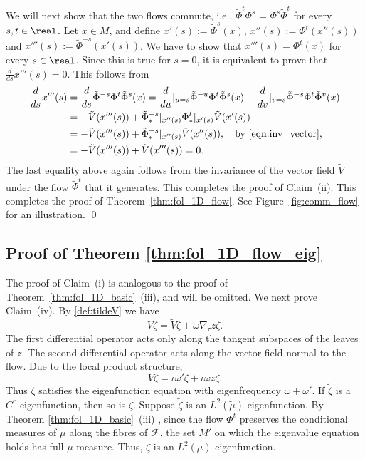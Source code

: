 \documentclass[12pt,oneside]{article}
\newcommand{\Fol}{\mathcal{F}}
\begin{document}
We will next show that the two flows commute, i.e., $\tilde{\Phi}^t \Phi^s $ = $\Phi^s \tilde{\Phi}^{t}$ for every $s,t\in\real$. Let $x\in M$, and define $x'(s) := \tilde{\Phi}^s(x)$, $x''(s) := \Phi^t(x''(s))$ and $x'''(s) := \tilde{\Phi}^{-s}(x'(s))$. We have to show that $x'''(s) = \Phi^t(x)$ for every $s\in\real$. Since this is true for $s=0$, it is equivalent to prove that $\frac{d}{ds} x'''(s) = 0$. This follows from
%
\[\begin{split}
\frac{d}{ds} x'''(s) &= \frac{d}{ds} \tilde{\Phi}^{-s} \Phi^t \tilde{\Phi}^s(x) = \frac{d}{du}|_{u=s} \tilde{\Phi}^{-u} \Phi^t \tilde{\Phi}^s(x) + \frac{d}{dv}|_{v=s} \tilde{\Phi}^{-s} \Phi^t \tilde{\Phi}^v(x) \\
&= -\tilde{V}(x'''(s)) + \tilde{\Phi}^{-s}_*|_{x''(s)} \Phi^t_*|_{x'(s)} \tilde{V}(x'(s)) \\
& = -\tilde{V}(x'''(s)) + \tilde{\Phi}^{-s}_*|_{x''(s)} \tilde{V}(x''(s)), \quad \mbox{by } \eqref{eqn:inv_vector}, \\
& = -\tilde{V}(x'''(s)) + \tilde{V}(x'''(s)) = 0.
\end{split}\]
%
The last equality above again follows from the invariance of the vector field $\tilde{V}$ under the flow $\tilde{\Phi}^t$ that it generates. This completes the proof of Claim~(ii). This completes the proof of Theorem~\ref{thm:fol_1D_flow}. See Figure~\ref{fig:comm_flow} for an illustration. \qed

\subsection{Proof of Theorem \ref{thm:fol_1D_flow_eig}} \label{sec:proof:fol_1D_flow_eig}

The proof of Claim~(i) is analogous to the proof of Theorem~\ref{thm:fol_1D_basic}~(iii), and will be omitted. We next prove Claim~(iv). By \eqref{def:tildeV} we have
%
\[ V \zeta = \tilde{V} \zeta + \omega \nabla_\tau z \zeta . \]
%
The first differential operator acts only along the tangent subspaces of the leaves of $z$. The second differential operator acts along the vector field normal to the flow. Due to the local product structure,
%
\[ V \zeta = \iota \omega' \zeta + \iota \omega z \zeta . \]
%
Thus $\zeta$ satisfies the eigenfunction equation with eigenfrequency $\omega + \omega'$. If $\tilde\zeta$ is a $C^r$ eigenfunction, then so is $\zeta$. Suppose $\tilde\zeta$ is an $L^2(\tilde{\mu})$ eigenfunction. By Theorem \ref{thm:fol_1D_basic}~(iii) , since the flow $\Phi^t$ preserves the conditional measures of $\mu$ along the fibres of $\Fol$, the set $M'$ on which the eigenvalue equation holds has full $\mu$-measure. Thus, $\zeta$ is an $L^2(\mu)$ eigenfunction.
\end{document}
